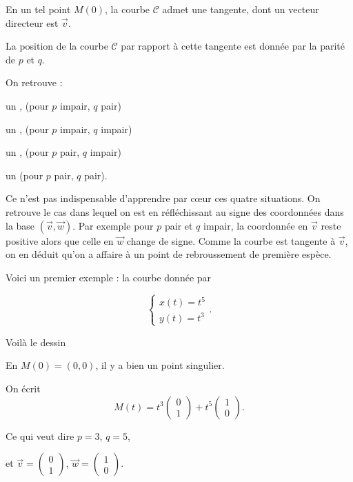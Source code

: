 \change
En un tel point $M(0)$, la courbe $\mathcal{C}$ admet une tangente, dont un vecteur directeur est 
$\overrightarrow{v}$. 

\change
La position de la courbe $\mathcal{C}$ par rapport à cette tangente
est donnée par la parité de $p$ et $q$. 

On retrouve :


\change
un , (pour $p$ impair, $q$ pair)

\change
un , (pour $p$ impair, $q$ impair)

\change
un , (pour $p$ pair, $q$ impair)

\change 
un  (pour $p$ pair, $q$ pair).


Ce n'est pas indispensable d'apprendre par cœur ces quatre situations. 
On retrouve le cas dans lequel on est en réfléchissant 
au signe des coordonnées dans la base 
$(\overrightarrow{v},\overrightarrow{w})$. 
Par exemple pour $p$ pair et $q$ impair, 
la coordonnée en $\overrightarrow{v}$ 
reste positive alors que celle en 
$\overrightarrow{w}$ change de signe. 
Comme la courbe est tangente à $\overrightarrow{v}$, 
on en déduit qu'on a affaire à un point de 
rebroussement de première espèce.



\diapo

Voici un premier exemple : la courbe donnée par 

$$\left\{\begin{array}{l} x(t) = t^5\\ y(t) = t^3\end{array}\right..$$

\change
Voilà le dessin

\change
En $M(0)=(0,0)$, il y a bien un point singulier.


On écrit
$$M(t) = t^3 \begin{pmatrix}0\\1\end{pmatrix} + t^5 
\begin{pmatrix}1\\0\end{pmatrix}.$$

\change
Ce qui veut dire $p=3$, $q=5$, 

\change
et 
$\overrightarrow{v}=\left(\begin{smallmatrix}0\\1\end{smallmatrix}\right)$,
$\overrightarrow{w}=\left(\begin{smallmatrix}1\\0\end{smallmatrix}\right)$.

